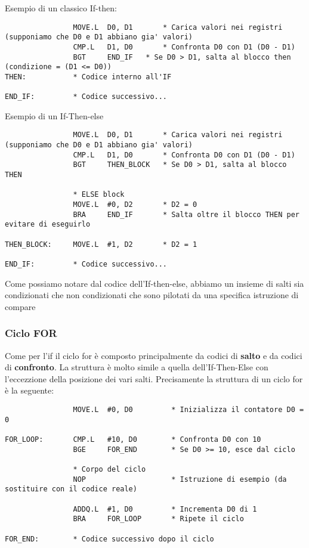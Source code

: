 Esempio di un classico If-then:
\begin{lstlisting}
                MOVE.L  D0, D1       * Carica valori nei registri (supponiamo che D0 e D1 abbiano gia' valori)
                CMP.L   D1, D0       * Confronta D0 con D1 (D0 - D1)
                BGT     END_IF   * Se D0 > D1, salta al blocco then (condizione = (D1 <= D0))
THEN:           * Codice interno all'IF

END_IF:         * Codice successivo...
\end{lstlisting}

Esempio di un If-Then-else
\begin{lstlisting}
                MOVE.L  D0, D1       * Carica valori nei registri (supponiamo che D0 e D1 abbiano gia' valori)
                CMP.L   D1, D0       * Confronta D0 con D1 (D0 - D1)
                BGT     THEN_BLOCK   * Se D0 > D1, salta al blocco THEN

                * ELSE block
                MOVE.L  #0, D2       * D2 = 0
                BRA     END_IF       * Salta oltre il blocco THEN per evitare di eseguirlo

THEN_BLOCK:     MOVE.L  #1, D2       * D2 = 1

END_IF:         * Codice successivo...
\end{lstlisting}

Come possiamo notare dal codice dell'If-then-else, abbiamo un insieme di salti sia condizionati che non condizionati che sono pilotati da una specifica istruzione di compare

\subsubsection{Ciclo FOR}
Come per l'if il ciclo for è composto principalmente da codici di \textbf{salto} e da codici di \textbf{confronto}. La struttura è molto simile a quella dell'If-Then-Else con l'eccezzione della posizione dei vari salti.
Precisamente la struttura di un ciclo for è la seguente:
\begin{lstlisting}
                MOVE.L  #0, D0         * Inizializza il contatore D0 = 0

FOR_LOOP:       CMP.L   #10, D0        * Confronta D0 con 10
                BGE     FOR_END        * Se D0 >= 10, esce dal ciclo

                * Corpo del ciclo
                NOP                    * Istruzione di esempio (da sostituire con il codice reale)

                ADDQ.L  #1, D0         * Incrementa D0 di 1
                BRA     FOR_LOOP       * Ripete il ciclo

FOR_END:        * Codice successivo dopo il ciclo

\end{lstlisting}

